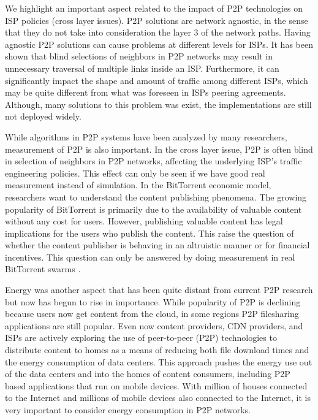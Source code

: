 We highlight an important aspect related to the impact of P2P technologies on ISP policies (cross layer issues). 
P2P solutions are network agnostic, in the sense that they do not take into consideration the layer 3 of the network paths. 
Having agnostic P2P solutions can cause problems at different levels for ISPs. 
It has been shown that blind selections of neighbors in P2P networks may result in unnecessary traversal of multiple links inside an ISP. 
Furthermore, it can significantly impact  the shape and amount of traffic among different ISPs, which may be quite different from what was foreseen in ISPs peering agreements.
Although, many solutions to this problem was exist, the implementations are still not deployed widely.  

While algorithms in P2P systems have been analyzed by many researchers, measurement of P2P is also important.
In the cross layer issue, P2P is often blind in selection of neighbors in P2P networks, affecting the underlying ISP's traffic engineering policies.  
This effect can only be seen if we have good real measurement instead of simulation.
In the BitTorrent economic model, researchers want to understand the content publishing phenomena. 
The growing popularity of BitTorrent is primarily due to the availability of valuable content without any cost for users.
However, publishing valuable content has legal implications for the users who publish the content.
This raise the question of whether the content publisher is behaving in an altruistic manner or for financial incentives. 
This question can only be answered by doing measurement in real BitTorrent swarms \cite{6381497}. 

Energy was another aspect that has been quite distant from current P2P research but now has begun to rise in importance. 
While popularity of P2P is declining because users now get content from the cloud, in some regions P2P filesharing applications are still popular.
Even now content providers, CDN providers, and ISPs are actively exploring the use of peer-to-peer (P2P) technologies to distribute content to homes as a means of reducing both file download times and the energy consumption of data centers. 
This approach pushes the energy use out of the data centers and into the homes of content consumers, including P2P based applications that run on mobile devices.
With million of houses connected to the Internet and millions of mobile devices also connected to the Internet, it is very important to consider energy consumption in P2P networks.


